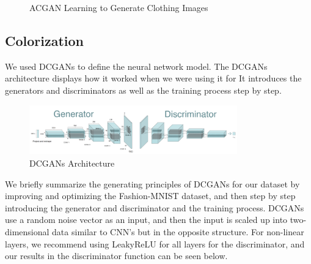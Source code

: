\documentclass[conference]{IEEEtran}
\begin{document}
    \begin{figure}
        \caption{ACGAN Learning to Generate Clothing Images}
        \label{fig:results1}
        \centering
    \end{figure}

    
    \subsection{Colorization}\label{subsec:results-colorization}
    
    We used DCGANs to define the neural network model. The DCGANs architecture displays how it worked when we were using it for It introduces the generators and discriminators as well as the training process step by step.
        
        \begin{figure}[h]
        \caption{DCGANs Architecture}
	\includegraphics[width=9cm]{architecture.png}
	\centering
	\end{figure}

   We briefly summarize the generating principles of DCGANs for our dataset by improving and optimizing the Fashion-MNIST dataset, and then step by step introducing the generator and discriminator and the training process. DCGANs use a random noise vector as an input, and then the input is scaled up into two-dimensional data similar to CNN's but in the opposite structure. For non-linear layers, we recommend using LeakyReLU for all layers for the discriminator, and our results in the discriminator function can be seen below.     
   
\end{document}
